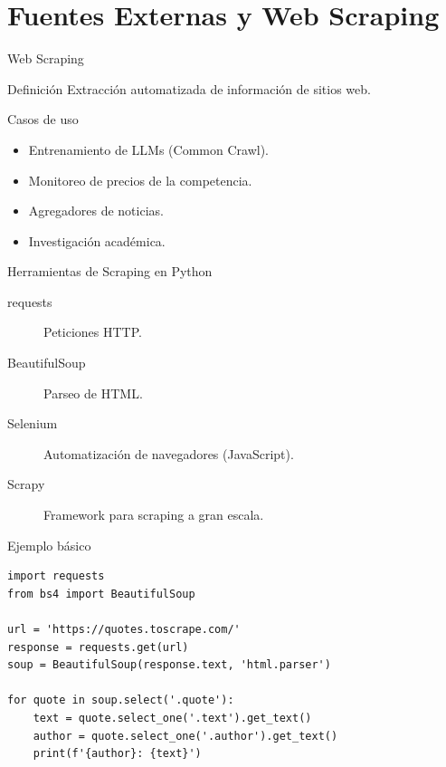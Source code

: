 \documentclass[aspectratio=169, 10pt, xcolor=table]{beamer}
\begin{document}
\section{Fuentes Externas y Web Scraping}

\begin{frame}{Web Scraping}
    \begin{block}{Definición}
        Extracción automatizada de información de sitios web.
    \end{block}
    \begin{exampleblock}{Casos de uso}
        \begin{itemize}
            \item Entrenamiento de LLMs (Common Crawl).
            \item Monitoreo de precios de la competencia.
            \item Agregadores de noticias.
            \item Investigación académica.
        \end{itemize}
    \end{exampleblock}
\end{frame}

\begin{frame}[fragile]{Herramientas de Scraping en Python}
    \begin{description}
        \item[requests] Peticiones HTTP.
        \item[BeautifulSoup] Parseo de HTML.
        \item[Selenium] Automatización de navegadores (JavaScript).
        \item[Scrapy] Framework para scraping a gran escala.
    \end{description}
    \begin{block}{Ejemplo básico}
        \begin{lstlisting}[style=python]
import requests
from bs4 import BeautifulSoup

url = 'https://quotes.toscrape.com/'
response = requests.get(url)
soup = BeautifulSoup(response.text, 'html.parser')

for quote in soup.select('.quote'):
    text = quote.select_one('.text').get_text()
    author = quote.select_one('.author').get_text()
    print(f'{author}: {text}')
        \end{lstlisting}
    \end{block}
\end{frame}
\end{document}

